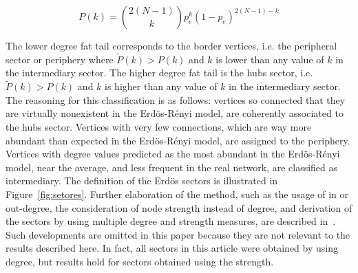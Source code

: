 \documentclass[review]{elsarticle}
\begin{document}
\begin{equation}
P(k)=\binom{2(N-1)}{k}p_e^k(1-p_e)^{2(N-1)-k}
\end{equation}

The lower degree fat tail corresponds to the border vertices,
i.e. the peripheral sector or periphery where $\widetilde{P}(k)>P(k)$ and $k$
is lower than any value of $k$ in the intermediary sector.
The higher degree fat tail is the hubs sector,
i.e. $\widetilde{P}(k)>P(k)$ and $k$ is higher than any value of $k$ in the intermediary sector.
The reasoning for this classification is as follows:
vertices so connected that they are virtually nonexistent in the Erd\"os-R\'enyi model, are coherently associated to the hubs sector.
Vertices with very few connections, which are way more abundant than expected in the Erd\"os-R\'enyi model,
are assigned to the periphery.
Vertices with degree values predicted as the most abundant in the Erd\"os-R\'enyi model,
near the average, and less frequent in the real network, are classified as intermediary.
The definition of the Erdös sectors is illustrated in Figure~\ref{fig:setores}.
Further elaboration of the method, such as the usage of in or out-degree,
the consideration of node strength instead of degree,
and derivation of the sectors by using multiple degree and strength measures, are described in~\cite{stab}.
Such developments are omitted in this paper because they are not relevant to the results described here.
In fact, all sectors in this article were obtained by using degree,
but results hold for sectors obtained using the strength.
\end{document}

